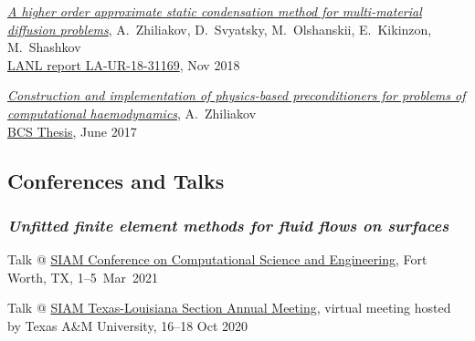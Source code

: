 \documentclass[a4paper,12pt]{article}
\begin{document}
\begin{etaremune}[topsep=0pt]
		\item \textit{\href{https://www.researchgate.net/publication/329327346_A_higher_order_approximate_static_condensation_method_for_multi-material_diffusion_problems}{A higher order approximate static condensation method for multi-material diffusion problems}}, A.~Zhiliakov, D.~Svyatsky, M.~Olshanskii, E.~Kikinzon, M.~Shashkov\\ \href{https://permalink.lanl.gov/object/tr?what=info:lanl-repo/lareport/LA-UR-18-31169}{LANL report LA-UR-18-31169}, Nov 2018 
		\item \textit{\href{https://www.researchgate.net/publication/318039077_Postroenie_i_realizacia_fiziceskih_pereobuslavlivatelej_dla_zadac_vycislitelnoj_gemodinamiki}{Construction and implementation of physics-based preconditioners for problems of computational haemodynamics}}, A.~Zhiliakov\\ \href{https://elibrary.nstu.ru/source?id=61216}{BCS Thesis}, June 2017   
%			
%			
	\end{etaremune}

	\subsection*{Conferences and Talks}
	
	\subsubsection*{\textit{Unfitted finite element methods for fluid flows on surfaces}}
	\begin{etaremune}[topsep=0pt]
		\item Talk @ \href{https://www.siam.org/conferences/cm/conference/cse21}{SIAM Conference on Computational Science and Engineering}, Fort Worth, TX, 1--5~Mar~2021
		\item Talk @ \href{https://www.math.tamu.edu/conferences/SIAMTXLA/}{SIAM Texas-Louisiana Section Annual Meeting}, virtual meeting
		hosted by Texas A\&M University, 16--18 Oct 2020
	\end{etaremune}
\end{document}
